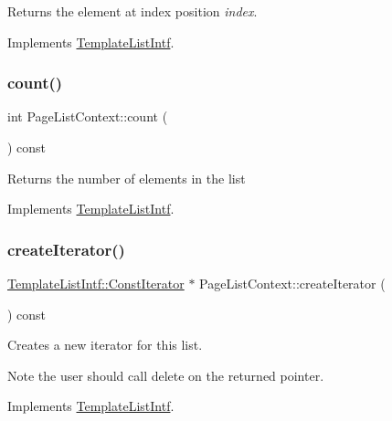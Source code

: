 Returns the element at index position {\itshape index}. 

Implements \mbox{\hyperlink{class_template_list_intf_aa51e57e72eacf4e8ce1055ee30a0f7f8}{Template\+List\+Intf}}.

\mbox{\label{class_page_list_context_aeb9332b426d2dc8639fbbbbc1f54b30c}} 
\subsubsection{\texorpdfstring{count()}{count()}}
{\footnotesize\ttfamily int Page\+List\+Context\+::count (\begin{DoxyParamCaption}{ }\end{DoxyParamCaption}) const\hspace{0.3cm}{\ttfamily [virtual]}}

Returns the number of elements in the list 

Implements \mbox{\hyperlink{class_template_list_intf_a329e49e33484c2aa5106aac1bf4e5216}{Template\+List\+Intf}}.

\mbox{\label{class_page_list_context_ac137e9b79bdc80c05ce4030c59c5057b}} 
\subsubsection{\texorpdfstring{createIterator()}{createIterator()}}
{\footnotesize\ttfamily \mbox{\hyperlink{class_template_list_intf_1_1_const_iterator}{Template\+List\+Intf\+::\+Const\+Iterator}} $\ast$ Page\+List\+Context\+::create\+Iterator (\begin{DoxyParamCaption}{ }\end{DoxyParamCaption}) const\hspace{0.3cm}{\ttfamily [virtual]}}

Creates a new iterator for this list. \begin{DoxyNote}{Note}
the user should call delete on the returned pointer. 
\end{DoxyNote}


Implements \mbox{\hyperlink{class_template_list_intf_a56b82384db24c3e121076a1da046d378}{Template\+List\+Intf}}.

